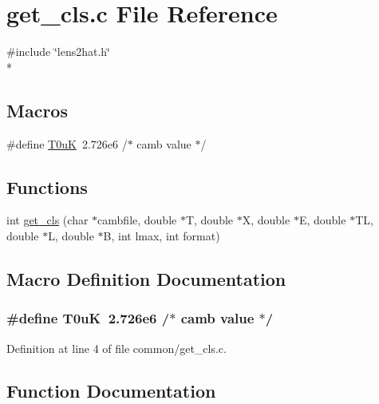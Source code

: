 \section{get\-\_\-cls.\-c File Reference}
\label{common_2get__cls_8c}
{\ttfamily \#include \char`\"{}lens2hat.\-h\char`\"{}}\\*
\subsection*{Macros}
\begin{DoxyCompactItemize}
\item 
\#define \hyperlink{common_2get__cls_8c_a08cd9bfd4b050dde02e833f33461b671}{T0u\-K}~2.\-726e6           /$\ast$ camb value $\ast$/
\end{DoxyCompactItemize}
\subsection*{Functions}
\begin{DoxyCompactItemize}
\item 
int \hyperlink{common_2get__cls_8c_af9a60e15f3021cfb6634c159b19507f5}{get\-\_\-cls} (char $\ast$cambfile, double $\ast$T, double $\ast$X, double $\ast$E, double $\ast$T\-L, double $\ast$L, double $\ast$B, int lmax, int format)
\end{DoxyCompactItemize}


\subsection{Macro Definition Documentation}
\subsubsection[{T0u\-K}]{\setlength{\rightskip}{0pt plus 5cm}\#define T0u\-K~2.\-726e6           /$\ast$ camb value $\ast$/}\label{common_2get__cls_8c_a08cd9bfd4b050dde02e833f33461b671}


Definition at line 4 of file common/get\-\_\-cls.\-c.



\subsection{Function Documentation}
